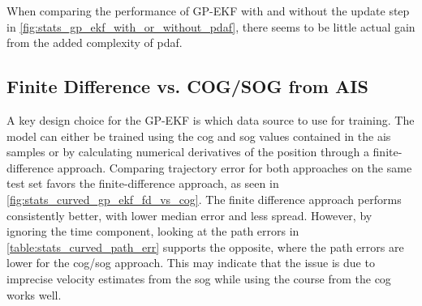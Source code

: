 When comparing the performance of GP-EKF with and without the update step in \cref{fig:stats_gp_ekf_with_or_without_pdaf}, there seems to be little actual gain from the added complexity of \acrshort{pdaf}.


\subsection{Finite Difference vs. COG/SOG from AIS}
A key design choice for the GP-EKF is which data source to use for training. The model can either be trained using the \acrshort{cog} and \acrshort{sog} values contained in the \acrshort{ais} samples or by calculating numerical derivatives of the position through a finite-difference approach. Comparing trajectory error for both approaches on the same test set favors the finite-difference approach, as seen in \cref{fig:stats_curved_gp_ekf_fd_vs_cog}. The finite difference approach performs consistently better, with lower median error and less spread. However, by ignoring the time component, looking at the path errors in \cref{table:stats_curved_path_err} supports the opposite, where the path errors are lower for the \acrshort{cog}/\acrshort{sog} approach. This may indicate that the issue is due to imprecise velocity estimates from the \acrshort{sog} while using the course from the \acrshort{cog} works well.
